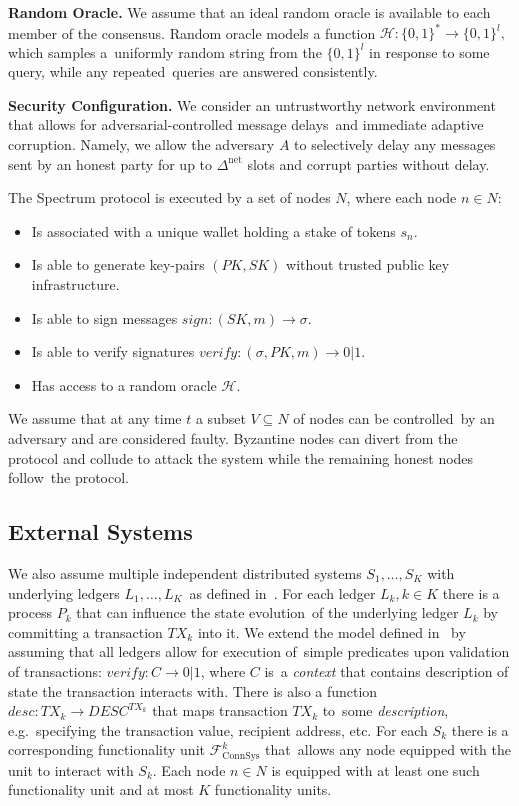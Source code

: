 \textbf{Random Oracle.}
We assume that an ideal random oracle is available to each member of the consensus.
Random oracle models a function ${\mathcal{H} : \{0, 1\}^* \rightarrow \{0, 1\}^l, }$ which samples a\
uniformly random string from the ${\{0, 1\}^l}$ in response to some query, while any repeated\
queries are answered consistently.

\textbf{Security Configuration.}
We consider an untrustworthy network environment that allows for adversarial-controlled message delays\
and immediate adaptive corruption.
Namely, we allow the adversary $A$ to selectively delay any messages sent
by an honest party for up to $\Delta^{\text{net}}$ slots and corrupt parties without delay.

The Spectrum protocol is executed by a set of nodes $N$, where each node $n \in N$:
\begin{itemize}
    \item Is associated with a unique wallet holding a stake of tokens $s_n$.
    \item Is able to generate key-pairs ${(PK, SK)}$ without trusted public key infrastructure.
    \item Is able to sign messages ${sign: (SK, m) \rightarrow \sigma}$.
    \item Is able to verify signatures ${verify: (\sigma, PK, m) \rightarrow 0 | 1}$.
    \item Has access to a random oracle $\mathcal{H}$.
\end{itemize}

We assume that at any time $t$ a subset ${V \subseteq N}$ of nodes can be controlled\
by an adversary and are considered faulty.
Byzantine nodes can divert from the protocol and collude to attack the system while the remaining honest nodes follow\
the protocol.

\subsection{External Systems}\label{subsec:external-systems.}
We also assume multiple independent distributed systems ${S_1, \dots, S_K}$ with underlying ledgers ${L_1, \dots, L_K}$\
as defined in~\cite{cryptoeprint:2019/1128}.
For each ledger ${L_k, k \in K}$ there is a process $P_k$ that can influence the state evolution\
of the underlying ledger $L_k$ by committing a transaction $TX_k$ into it.
We extend the model defined in~\cite{cryptoeprint:2019/1128} by assuming that all ledgers allow for execution of\
simple predicates upon validation of transactions: ${verify: C \rightarrow 0 | 1}$, where $C$ is\
a \emph{context} that contains description of state the transaction interacts with.
There is also a function ${desc: TX_k \rightarrow DESC^{TX_k}}$ that maps transaction $TX_k$ to\
some \emph{description}, e.g.\ specifying the transaction value, recipient address, etc.
For each $S_k$ there is a corresponding functionality unit $\mathcal{F}^k_{\text{ConnSys}}$ that\
allows any node equipped with the unit to interact with $S_k$.
Each node $n \in N$ is equipped with at least one such functionality unit and at most $K$ functionality units.

